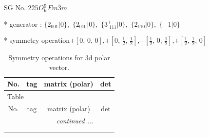 \documentclass[fleqn,8pt]{jsarticle}
\begin{document}
\setcounter{MaxMatrixCols}{32}

\renewcommand{\tablename}{Table~}
\renewcommand{\figurename}{Figure~}
\begin{center}
\LARGE
SG No. 225\quad$O_{\rm h}^{5}$\quad$Fm\bar{3}m$\quad[ cubic ]
\end{center}

* generator : $\{2{}_{001}|0\},\,\,\{2{}_{010}|0\},\,\,\{3^{+}_{\,\,111}|0\},\,\,\{2{}_{110}|0\},\,\,\{-1|0\}$

* symmetry operation\quad$+\left[ 0,\, 0,\, 0 \right]$,\quad $+\left[ 0,\, \frac{1}{2},\, \frac{1}{2} \right]$,\quad $+\left[ \frac{1}{2},\, 0,\, \frac{1}{2} \right]$,\quad $+\left[ \frac{1}{2},\, \frac{1}{2},\, 0 \right]$
\renewcommand{\arraystretch}{1.3}
\begin{longtable}{cccc}
\caption{Symmetry operations for 3d polar vector.}
 \\
 \hline \hline
No. & tag & matrix (polar) & det \\ \hline \endfirsthead

\multicolumn{3}{l}{\tablename\ \thetable{}} \\
 \hline \hline
No. & tag & matrix (polar) & det \\ \hline \endhead

 \hline \hline
\multicolumn{3}{r}{\footnotesize\it continued ...} \\ \endfoot

 \hline \hline
\multicolumn{3}{r}{} \\ \endlastfoot


\end{longtable}
\end{document}
